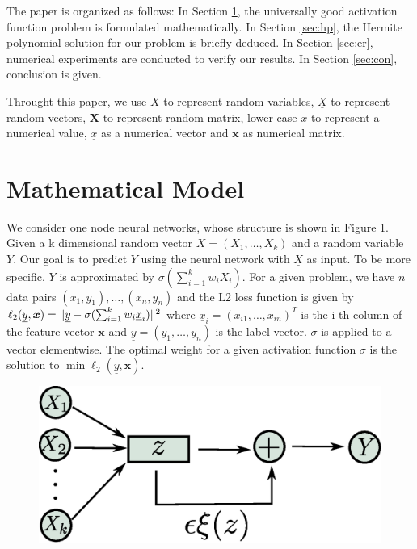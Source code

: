 \documentclass[conference,letterpaper]{IEEEtran}
\DeclarePairedDelimiter\norm{\lVert}{\rVert}
\begin{document}
The paper is organized as follows: In Section \ref{sec:mm}, the universally good activation function problem
is formulated mathematically.
In Section \ref{sec:hp}, the Hermite polynomial solution for our problem is briefly deduced.
In Section \ref{sec:er}, numerical experiments are conducted to verify our results.
In Section \ref{sec:con}, conclusion is given.

Throught this paper, we use $X$ to represent random variables,
$\underline{X}$ to represent random vectors,
$\bm{X}$ to represent random matrix,
lower case $x$ to represent a numerical value,
$\underline{x}$ as a numerical vector and $\bm{x}$ as numerical matrix.

\section{Mathematical Model}\label{sec:mm}
We consider one node neural networks, whose structure is shown in Figure \ref{fig:ns}.
Given a k dimensional random vector $\underline{X}=(X_1, \dots, X_k)$ and a random variable $Y$.
Our goal is to predict $Y$ using the neural network with $\underline{X}$ as input.
To be more specific, $Y$ is approximated by $ \sigma(\sum_{i=1}^k w_i X_i)$.
For a given problem, we have $n$ data pairs $(x_1, y_1), \dots, (x_n, y_n)$ and
the L2 loss function is given by
$\ell_2(\underline{y}, \bm{x}) = \norm{\underline{y} - \sigma(\sum_{i=1}^k w_i \underline{x}_i)}^2 $
where $\underline{x}_i= (x_{i1}, \dots, x_{in})^T$ is the i-th column of the feature vector $\bm{x}$ and
$\underline{y} = (y_1, \dots, y_n)$ is the label vector. $\sigma$ is applied to a vector elementwise.
The optimal weight for a given activation function $\sigma$ is the solution to $\min \ell_2(\underline{y}, \bm{x})$.
\begin{figure}\label{fig:ns}
\includegraphics[width=\linewidth]{network_structure.eps}
\end{figure}
\end{document}

